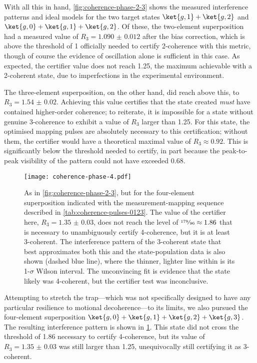 With all this in hand, \cref{fig:coherence-phase-2-3} shows the measured interference patterns and ideal models for the two target states $\ket{g,1}+\ket{g,2}$ and $\ket{g,0}+\ket{g,1}+\ket{g,2}$.
Of these, the two-element superposition had a measured value of $R_3 = \num{1.090(12)}$ after the bias correction, which is above the threshold of \num{1} officially needed to certify 2-coherence with this metric, though of course the evidence of oscillation alone is sufficient in this case.
As expected, the certifier value does not reach \num{1.25}, the maximum achievable with a 2-coherent state, due to imperfections in the experimental environment.

The three-element superposition, on the other hand, did reach above this, to $R_3 = \num{1.54(2)}$.
Achieving this value certifies that the state created \emph{must} have contained higher-order coherence; to reiterate, it is impossible for a state without genuine 3-coherence to exhibit a value of $R_3$ larger than \num{1.25}.
For this state, the optimised mapping pulses are absolutely necessary to this certification; without them, the certifier would have a theoretical maximal value of $R_3\approx\num{0.92}$.
This is significantly below the threshold needed to certify, in part because the peak-to-peak visibility of the pattern could not have exceeded \num{0.68}.

\begin{figure}%
    \texttt{[image: coherence-phase-4.pdf]}%
    \caption[Interference patterns of a four-element motional superposition]{\label{fig:coherence-phase-4}%
    As in \cref{fig:coherence-phase-2-3}, but for the four-element superposition indicated with the measurement-mapping sequence described in \cref{tab:coherence-pulses-0123}.
    The value of the certifier here, $R_3 = \num{1.35(3)}$, does not reach the level of $\text{\sfrac{179}{96}} \approx 1.86$ that is necessary to unambiguously certify 4-coherence, but it is at least 3-coherent.
    The interference pattern of the 3-coherent state that best approximates both this and the state-population data is also shown (dashed blue line), where the thinner, lighter line within is its 1-$\sigma$ Wilson interval.
    The unconvincing fit is evidence that the state likely was 4-coherent, but the certifier test was inconclusive.
}%
\end{figure}

Attempting to stretch the trap---which was not specifically designed to have any particular resilience to motional decoherence---to its limits, we also pursued the four-element superposition $\ket{g,0}+\ket{g,1}+\ket{g,2}+\ket{g,3}$.
The resulting interference pattern is shown in \cref{fig:coherence-phase-4}.
This state did not cross the threshold of \num{1.86} necessary to certify 4-coherence, but its value of $R_3 = \num{1.35(3)}$ was still larger than \num{1.25}, unequivocally still certifying it as 3-coherent.

